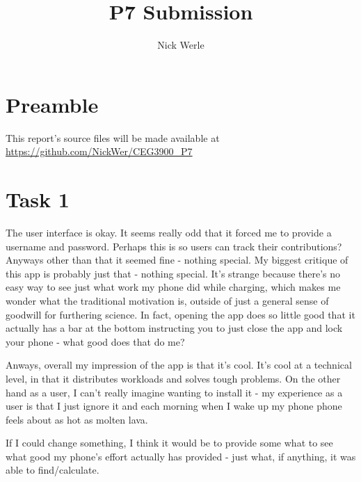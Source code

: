 \documentclass{article}
\author{Nick Werle}
\title{P7 Submission}
\begin{document}
\maketitle
\section{Preamble}
This report's source files will be made available at \url{https://github.com/NickWer/CEG3900_P7}

\section{Task 1}
The user interface is okay. It seems really odd that it forced me to provide a username and password. Perhaps this is so users can track their contributions? Anyways other than that it seemed fine - nothing special.
My biggest critique of this app is probably just that - nothing special.
It's strange because there's no easy way to see just what work my phone did while charging, which makes me wonder what the traditional motivation is, outside of just a general sense of goodwill for furthering science.
In fact, opening the app does so little good that it actually has a bar at the bottom instructing you to just close the app and lock your phone - what good does that do me?

Anways, overall my impression of the app is that it's cool. It's cool at a technical level, in that it distributes workloads and solves tough problems.
On the other hand as a user, I can't really imagine wanting to install it - my experience as a user is that I just ignore it and each morning when I wake up my phone phone feels about as hot as molten lava.

If I could change something, I think it would be to provide some what to see what good my phone's effort actually has provided - just what, if anything, it was able to find/calculate.
\end{document}
